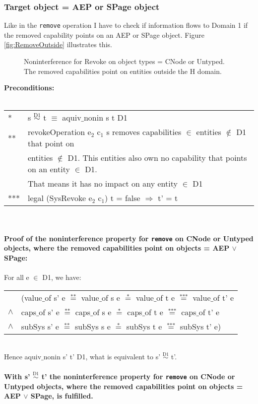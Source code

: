 \subsubsection{Target object = AEP or SPage object}
Like in the \texttt{remove} operation I have to check if information flows to Domain 1 if the removed capability points on an AEP or SPage object. Figure \ref{fig:RemoveOutside} illustrates this. 
\begin{figure}[H]
\caption{Noninterference for Revoke on object types = CNode or Untyped. The removed capabilities point on entities outside the H domain.}
\label{fig:RevokeOutside}
\end{figure}
\textbf{Preconditions:} \\ \\
\begin{tabular}{ll}
* & s $\overset{\text{D1}}{\sim}$ t $\equiv$ aquiv$\_$nonin s t D1	\\ 
** & revokeOperation e$_2$ c$_1$ s removes capabilities $\in$ entities $\notin$ D1 that point on \\
& entities $\notin$ D1. This entities also own no capability that points on an entity $\in$ D1. \\
& That means it has no impact on any entity $\in$ D1 \\ 
*** & legal (SysRevoke e$_2$ c$_1$) t = false $\Rightarrow$ t' = t
\end{tabular} \\ \\ 
\textbf{Proof of the noninterference property for \texttt{remove} on CNode or Untyped objects, where the removed capabilities point on objects = AEP $\vee$ SPage:}\\ \\
For all e $\in$ D1, we have: \\ 
\begin{tabular}{ll}
& (value$\_$of s' e $\overset{\text{**}}{=}$ value$\_$of s e $\overset{\text{*}}{=}$ value$\_$of t e $\overset{\text{***}}{=}$ value$\_$of t' e \\
$\wedge$ & caps$\_$of s' e $\overset{\text{**}}{=}$ caps$\_$of s e $\overset{\text{*}}{=}$ caps$\_$of t e $\overset{\text{***}}{=}$ caps$\_$of t' e \\
$\wedge$ & subSys s' e $\overset{\text{**}}{=}$ subSys s e $\overset{\text{*}}{=}$ subSys t e $\overset{\text{***}}{=}$ subSys t' e)
\end{tabular} \\
Hence aquiv$\_$nonin s' t' D1, what is equivalent to s' $\overset{\text{D1}}{\sim}$ t'.\\ \\ 
\textbf{With s' $\overset{\text{D1}}{\sim}$ t' the noninterference property for \texttt{remove} on CNode or Untyped objects, where the removed capabilities point on objects = AEP $\vee$ SPage, is fulfilled.}  
\clearpage
